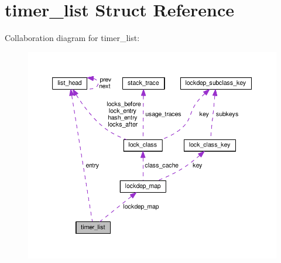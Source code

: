 \hypertarget{structtimer__list}{}\section{timer\+\_\+list Struct Reference}
\label{structtimer__list}


Collaboration diagram for timer\+\_\+list\+:
\nopagebreak
\begin{figure}[H]
\begin{center}
\leavevmode
\includegraphics[width=350pt]{structtimer__list__coll__graph}
\end{center}
\end{figure}
